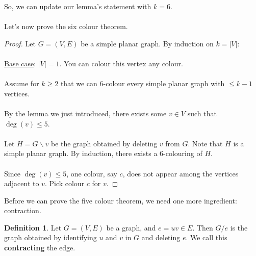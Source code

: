 \documentclass[]{article}
\theoremstyle{definition}
\newtheorem*{defn}{Definition}
\begin{document}
			So, we can update our lemma's statement with $k = 6$.
			\\ \\
			Let's now prove the six colour theorem.
			\begin{proof}
				Let $G = (V, E)$ be a simple planar graph. By induction on $k = |V|$:
				\\ \\
				\underline{Base case}: $|V| = 1$. You can colour this vertex any colour.
				\\ \\
				Assume for $k \ge 2$ that we can 6-colour every simple planar graph with $\le k - 1$ vertices.
				\\ \\
				By the lemma we just introduced, there exists some $v \in V$ such that $\deg(v) \le 5$.
				\\ \\
				Let $H = G \backslash v$ be the graph obtained by deleting $v$ from $G$. Note that $H$ is a simple planar graph. By induction, there exists a 6-colouring of $H$.
				\\ \\
				Since $\deg(v) \le 5$, one colour, say $c$, does not appear among the vertices adjacent to $v$. Pick colour $c$ for $v$.
			\end{proof}

			Before we can prove the five colour theorem, we need one more ingredient: contraction.

			\begin{defn}
				Let $G = (V, E)$ be a graph, and $e = uv \in E$. Then $G/e$ is the graph obtained by identifying $u$ and $v$ in $G$ and deleting $e$. We call this \textbf{contracting} the edge.
			\end{defn}
\end{document}

